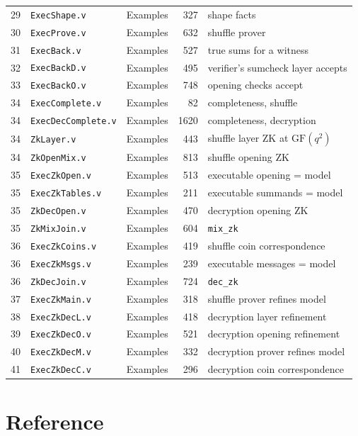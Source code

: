 \documentclass[11pt,a4paper]{article}
\theoremstyle{definition}
\theoremstyle{plain}
\begin{document}
{\begin{longtable}{@{}rlp{}rp{}@{}}
29 & \texttt{ExecShape.v} & Examples & 327 & shape facts\\
30 & \texttt{ExecProve.v} & Examples & 632 & shuffle prover\\
31 & \texttt{ExecBack.v} & Examples & 527 & true sums for a witness\\
32 & \texttt{ExecBackD.v} & Examples & 495 & verifier's sumcheck layer accepts\\
33 & \texttt{ExecBackO.v} & Examples & 748 & opening checks accept\\
34 & \texttt{ExecComplete.v} & Examples & 82 & completeness, shuffle\\
34 & \texttt{ExecDecComplete.v} & Examples & 1620 & completeness, decryption\\
34 & \texttt{ZkLayer.v} & Examples & 443 & shuffle layer ZK at $\mathrm{GF}(q^2)$\\
34 & \texttt{ZkOpenMix.v} & Examples & 813 & shuffle opening ZK\\
35 & \texttt{ExecZkOpen.v} & Examples & 513 & executable opening = model\\
35 & \texttt{ExecZkTables.v} & Examples & 211 & executable summands = model\\
35 & \texttt{ZkDecOpen.v} & Examples & 470 & decryption opening ZK\\
35 & \texttt{ZkMixJoin.v} & Examples & 604 & \texttt{mix\_zk}\\
36 & \texttt{ExecZkCoins.v} & Examples & 419 & shuffle coin correspondence\\
36 & \texttt{ExecZkMsgs.v} & Examples & 239 & executable messages = model\\
36 & \texttt{ZkDecJoin.v} & Examples & 724 & \texttt{dec\_zk}\\
37 & \texttt{ExecZkMain.v} & Examples & 318 & shuffle prover refines model\\
38 & \texttt{ExecZkDecL.v} & Examples & 418 & decryption layer refinement\\
39 & \texttt{ExecZkDecO.v} & Examples & 521 & decryption opening refinement\\
40 & \texttt{ExecZkDecM.v} & Examples & 332 & decryption prover refines model\\
41 & \texttt{ExecZkDecC.v} & Examples & 296 & decryption coin correspondence\\
\end{longtable}}

\part{Reference}
\end{document}
